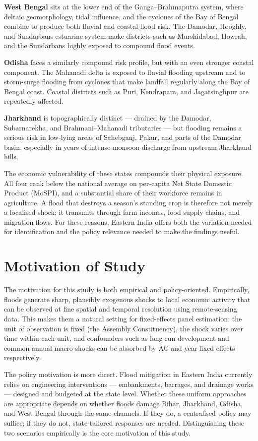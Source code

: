 \documentclass[12pt,a4paper,oneside]{report}
\begin{document}
\textbf{West Bengal} sits at the lower end of the Ganga--Brahmaputra system, where deltaic geomorphology, tidal influence, and the cyclones of the Bay of Bengal combine to produce both fluvial and coastal flood risk. The Damodar, Hooghly, and Sundarbans estuarine system make districts such as Murshidabad, Howrah, and the Sundarbans highly exposed to compound flood events.

\textbf{Odisha} faces a similarly compound risk profile, but with an even stronger coastal component. The Mahanadi delta is exposed to fluvial flooding upstream and to storm-surge flooding from cyclones that make landfall regularly along the Bay of Bengal coast. Coastal districts such as Puri, Kendrapara, and Jagatsinghpur are repeatedly affected.

\textbf{Jharkhand} is topographically distinct --- drained by the Damodar, Subarnarekha, and Brahmani--Mahanadi tributaries --- but flooding remains a serious risk in low-lying areas of Sahebganj, Pakur, and parts of the Damodar basin, especially in years of intense monsoon discharge from upstream Jharkhand hills.

The economic vulnerability of these states compounds their physical exposure. All four rank below the national average on per-capita Net State Domestic Product (MoSPI), and a substantial share of their workforce remains in agriculture. A flood that destroys a season's standing crop is therefore not merely a localised shock; it transmits through farm incomes, food supply chains, and migration flows. For these reasons, Eastern India offers both the variation needed for identification and the policy relevance needed to make the findings useful.

\section{Motivation of Study}
The motivation for this study is both empirical and policy-oriented. Empirically, floods generate sharp, plausibly exogenous shocks to local economic activity that can be observed at fine spatial and temporal resolution using remote-sensing data. This makes them a natural setting for fixed-effects panel estimation: the unit of observation is fixed (the Assembly Constituency), the shock varies over time within each unit, and confounders such as long-run development and common annual macro-shocks can be absorbed by AC and year fixed effects respectively.

The policy motivation is more direct. Flood mitigation in Eastern India currently relies on engineering interventions --- embankments, barrages, and drainage works --- designed and budgeted at the state level. Whether these uniform approaches are appropriate depends on whether floods damage Bihar, Jharkhand, Odisha, and West Bengal through the same channels. If they do, a centralised policy may suffice; if they do not, state-tailored responses are needed. Distinguishing these two scenarios empirically is the core motivation of this study.
\end{document}

